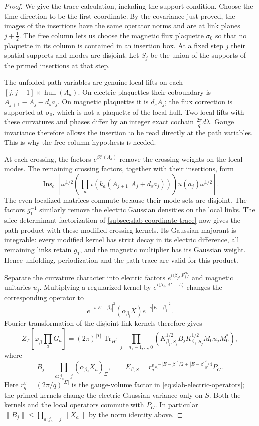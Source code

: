 \documentclass[11pt,letterpaper,reqno]{amsart}
\begin{document}
\begin{proof}
We give the trace calculation, including the support condition.
Choose the time direction to be the first coordinate. By the
covariance just proved, the images of the insertions have the same
operator norms and are at link planes $j+\tfrac12$. The free column
lets us choose the magnetic flux plaquette $\sigma_0$ so that no
plaquette in its column is contained in an insertion box.
At a fixed step $j$ their spatial supports and modes
are disjoint. Let $S_j$ be the union of the supports of the primed
insertions at that step.

The unfolded path variables are genuine local lifts on each
$[j,j+1]\times\operatorname{hull}(\Lambda_a)$. On electric
plaquettes their coboundary is $A_{j+1}-A_j-d_sa_j$. On magnetic
plaquettes it is $d_sA_j$; the flux correction is supported at
$\sigma_0$, which is not a plaquette of the local hull.
Two local lifts with
these curvatures and phases differ by an integer exact cochain
$\frac{2\pi}{q}d\lambda$. Gauge invariance therefore allows the
insertion to be read directly at the path variables. This is why
the free-column hypothesis is needed.

At each crossing, the factors $e^{S_c^\times(\Lambda_a)}$ remove
the crossing weights on the local modes. The remaining crossing
factors, together with their insertions, form
\[
 \operatorname{Ins}_c\left[
   \omega^{1/2}\left(\prod_a\iota(k_a(A_{j+1},A_j+d_sa_j))\right)
                   u(a_j)\omega^{1/2}\right].
\]
The even localized matrices commute because their mode sets are
disjoint. The factors $g_1^{-1}$ similarly remove the electric
Gaussian densities on the local links. The slice determinant
factorization of \cref{subsec:slab-coordinate-trace} now gives
the path product with these modified crossing kernels. Its
Gaussian majorant is integrable: every modified kernel has
strict decay in its electric difference, all remaining links
retain $g_1$, and the magnetic multiplier has its Gaussian
weight. Hence unfolding, periodization and the path trace are
valid for this product.

Separate the curvature character into electric factors
$e^{i\langle\beta_j,F_j^{\mathrm{el}}\rangle}$ and magnetic
unitaries $u_j$. Multiplying a regularized kernel by
$e^{i\langle\beta_j,A'-A\rangle}$ changes the corresponding
operator to
\[
 e^{-s|E-\beta_j|^2}(\alpha_{\beta_j}X)e^{-s|E-\beta_j|^2}.
\]
Fourier transformation of the disjoint link kernels therefore
gives
\begin{equation}\label{eq:diag-mixed-trace}
 Z_T\left[\varphi_\beta\prod_aG_a\right]
 =(2\pi)^{|T|}\operatorname{Tr}_{H^l}
  \prod_{j=n_1-1,\ldots,0}
  \left(K_{\beta_j,S_j}^{1/2}B_jK_{\beta_j,S_j}^{1/2}
                         M_0u_jM_0^*\right),
\end{equation}
where
\[
 B_j=\prod_{a:j_a=j}(\alpha_{\beta_j}X_a)_\Xi,\qquad
 K_{\beta,S}=r_q^v
     e^{-|E-\beta|^2/2+|E-\beta|_S^2/4}P_G.
\]
Here $r_q^v=(2\pi/q)^{|\Sigma|}$ is the gauge-volume factor in
\eqref{eq:slab-electric-operators}; the primed kernels change
the electric Gaussian variance only on $S$. Both the kernels and the local operators
commute with $P_G$. In particular
$\|B_j\|\le\prod_{a:j_a=j}\|X_a\|$ by the norm identity above.


\end{proof}
\end{document}
